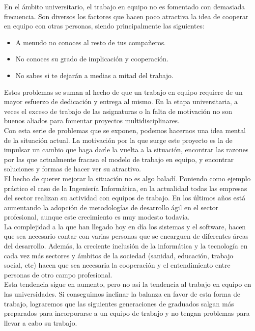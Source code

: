 En el ámbito universitario, el trabajo en equipo no es fomentado con demasiada frecuencia. Son diversos los factores que hacen poco atractiva la idea de cooperar en equipo con otras personas, siendo principalmente las siguientes:

\begin{itemize}
    \item A menudo no conoces al resto de tus compañeros.
    \item No conoces su grado de implicación y cooperación.
    \item No sabes si te dejarán a medias a mitad del trabajo.
\end{itemize}

Estos problemas se suman al hecho de que un trabajo en equipo requiere de un mayor esfuerzo de dedicación y entrega al mismo. En la etapa universitaria, a veces el exceso de trabajo de las asignaturas o la falta de motivación no son buenos aliados para fomentar proyectos multidisciplinares.\\

Con esta serie de problemas que se exponen, podemos hacernos una idea mental de la situación actual. La motivación por la que surge este proyecto es la de impulsar un cambio que haga darle la vuelta a la situación, encontrar las razones por las que actualmente fracasa el modelo de trabajo en equipo, y encontrar soluciones y formas de hacer ver su atractivo.\\

El hecho de querer mejorar la situación no es algo baladí. Poniendo como ejemplo práctico el caso de la Ingeniería Informática, en la actualidad todas las empresas del sector realizan su actividad con equipos de trabajo. En los últimos años está aumentando la adopción de metodologías de desarrollo ágil en el sector profesional, aunque este crecimiento es muy modesto todavía. \cite{agilereport}\\

La complejidad a la que han llegado hoy en día los sistemas y el software, hacen que sea necesario contar con varias personas que se encarguen de diferentes áreas del desarrollo. Además, la creciente inclusión de la informática y la tecnología en cada vez más sectores y ámbitos de la sociedad (sanidad, educación, trabajo social, etc) hacen que sea necesaria la cooperación y el entendimiento entre personas de otro campo profesional.\\

Esta tendencia sigue en aumento, pero no así la tendencia al trabajo en equipo en las universidades. Si conseguimos inclinar la balanza en favor de esta forma de trabajo, lograremos que las siguientes generaciones de graduados salgan más preparados para incorporarse a un equipo de trabajo y no tengan problemas para llevar a cabo su trabajo.\\

